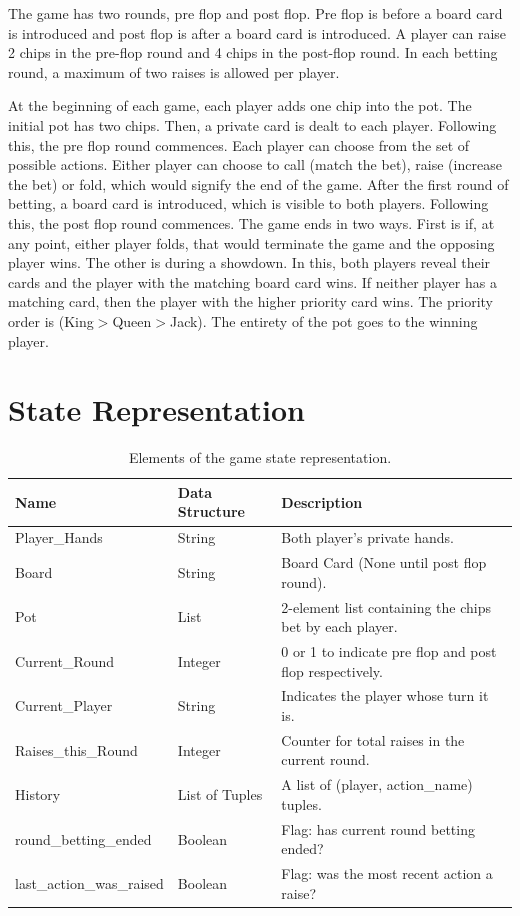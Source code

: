 \documentclass{article}
\begin{document}
The game has two rounds, pre flop and post flop. Pre flop is before a board card is introduced and post flop is after a board card is introduced. A player can raise 2 chips in the pre-flop round and 4 chips in the post-flop round. In each betting round, a maximum of two raises is allowed per player.

At the beginning of each game, each player adds one chip into the pot. The initial pot has two chips. Then, a private card is dealt to each player. Following this, the pre flop round commences. Each player can choose from the set of possible actions. Either player can choose to call (match the bet), raise (increase the bet) or fold, which would signify the end of the game. After the first round of betting, a board card is introduced, which is visible to both players. Following this, the post flop round commences. The game ends in two ways. First is if, at any point, either player folds, that would terminate the game and the opposing player wins. The other is during a showdown. In this, both players reveal their cards and the player with the matching board card wins. If neither player has a matching card, then the player with the higher priority card wins. The priority order is (King$>$Queen$>$Jack). The entirety of the pot goes to the winning player.

\section{State Representation}
\label{app:state}

\begin{table}[h]
\centering
\begin{tabular}{lll}
\toprule
\textbf{Name} & \textbf{Data Structure} & \textbf{Description} \\
\midrule
Player\_Hands       & String          & Both player's private hands. \\
Board               & String          & Board Card (None until post flop round). \\
Pot                 & List            & 2-element list containing the chips bet by each player. \\
Current\_Round      & Integer         & 0 or 1 to indicate pre flop and post flop respectively. \\
Current\_Player     & String          & Indicates the player whose turn it is. \\
Raises\_this\_Round & Integer         & Counter for total raises in the current round. \\
History             & List of Tuples  & A list of (player, action\_name) tuples. \\
round\_betting\_ended   & Boolean    & Flag: has current round betting ended? \\
last\_action\_was\_raised & Boolean  & Flag: was the most recent action a raise? \\
\bottomrule
\end{tabular}
\caption{Elements of the game state representation.}
\label{tab:state}
\end{table}
\end{document}
